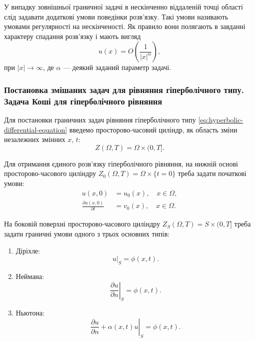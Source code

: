 У випадку зовнішньої граничної задачі в нескінченно віддаленій точці області слід задавати додаткові умови поведінки розв'язку. Такі умови називають умовами регулярності на нескінченості. Як правило вони полягають в завданні характеру спадання розв'язку і мають вигляд
\begin{equation}
    u(x) = O \left( \frac{1}{|x|^\alpha} \right),
\end{equation}
при $|x| \to \infty$, де $\alpha$ --- деякий заданий параметр задачі.

\subsubsection{Постановка змішаних задач для рівняння гіперболічного типу. Задача Коші для гіперболічного рівняння}

Для постановки граничних задач рівняння гіперболічного типу \eqref{eq:hyperbolic-differential-equation} введемо просторово-часовий циліндр, як область зміни незалежних змінних $x$, $t$:
\begin{equation}
    Z(\Omega, T) = \Omega \times (0, T].
\end{equation}

Для отримання єдиного розв'язку гіперболічного рівняння, на нижній основі просторово-часового циліндру $Z_0(\Omega, T) = \Omega \times \{t = 0\}$ треба задати початкові умови:
\begin{align}
    \label{eq:hyperbolic-starting-function-condition}
    u(x, 0) &= u_0(x), \quad x \in \Omega, \\
    \label{eq:hyperbolic-starting-derivative-condition}
    \frac{\partial u(x, 0)}{\partial t} &= v_0(x), \quad x \in \Omega.
\end{align}

На боковій поверхні просторово-часового циліндру $Z_S(\Omega, T) = S \times (0, T]$ треба задати граничні умови одного з трьох основних типів:
\begin{enumerate}
    \item Діріхле:
    \begin{equation}
        \label{eq:hyperbolic-dirichlet-boundary-conditions}
        \left. u \right|_S = \phi(x, t).
    \end{equation}
    \item Неймана:
    \begin{equation}
        \label{eq:hyperbolic-neumann-boundary-conditions}
        \left. \frac{\partial u}{\partial n} \right|_S = \phi(x, t).
    \end{equation}
    \item Ньютона:
    \begin{equation}
        \label{eq:hyperbolic-newton-boundary-conditions}
        \left. \frac{\partial u}{\partial n} + \alpha(x, t) u \right|_S = \phi(x, t).
    \end{equation}
\end{enumerate}

